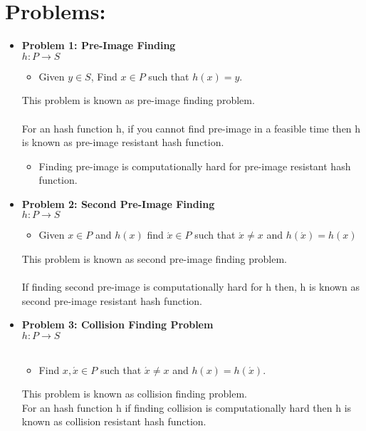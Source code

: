 \documentclass[11pt]{article}
\begin{document}
\section*{Problems:}
\begin{itemize}
    \item \textbf{Problem 1: Pre-Image Finding} \\
    $h: P \to S$ \\
    \begin{itemize}
        \item Given $y \in S$, Find $x \in P$ such that $h(x) = y$.\\
    \end{itemize}
This problem is known as pre-image finding problem.\\\\
For an hash function h, if you cannot find pre-image in a feasible time then h is known as pre-image resistant hash function.
\begin{itemize}
    \item Finding pre-image is computationally hard for pre-image resistant hash function.
\end{itemize}
\item \textbf{Problem 2: Second Pre-Image Finding}\\
$h: P \to S$\\
\begin{itemize}
    \item Given $x \in P$ and $h(x)$ find $\acute{x} \in P$ such that $\acute{x} \ne x$ and $h(\acute{x}) = h(x)$\\
\end{itemize}
This problem is known as second pre-image finding problem.\\\\
If finding second pre-image is computationally hard for h then, h is known as second pre-image resistant hash function.
\item \textbf{Problem 3: Collision Finding Problem}\\
$h: P \to S$\\\\
\begin{itemize}
    \item Find $x, \acute{x} \in P$ such that $\acute{x} \ne x$ and $h(x) = h(\acute{x})$.\\
\end{itemize}
This problem is known as collision finding problem.\\
For an hash function h if finding collision is computationally hard then h is known as collision resistant hash function.
\end{itemize}
\end{document}
